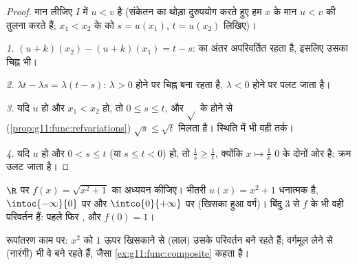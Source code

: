 \begin{proof}
मान लीजिए $I$ में $u < v$ है (संकेतन का थोड़ा दुरुपयोग करते हुए हम $x$
के मान $u < v$ की तुलना करते हैं; $x_1 < x_2$ के  को $s = u(x_1)$, $t = u(x_2)$ लिखिए)।

\emph{1.} $(u+k)(x_2) - (u+k)(x_1) = t - s$:  का अंतर अपरिवर्तित रहता है, इसलिए उसका चिह्न
भी।

\emph{2.} $\lambda t - \lambda s = \lambda(t - s)$: $\lambda > 0$ होने पर चिह्न बना रहता है, $\lambda < 0$ होने पर पलट जाता
है।

\emph{3.} यदि $u$  हो और $x_1 < x_2$ हो, तो $0 \leq s \leq t$, और $\sqrt{}$ के 
होने से (\cref{prop:g11:func:refvariations}) $\sqrt s \leq \sqrt t$ मिलता है।  स्थिति में भी वही तर्क।

\emph{4.} यदि $u$  हो और $0 < s \leq t$ (या $s \leq t < 0$) हो, तो $\frac1s \geq \frac1t$, क्योंकि
$x \mapsto \frac1x$ $0$ के दोनों ओर  है: क्रम उलट जाता है।
\end{proof}

\begin{example}\label{ex:g11:func:composite}
$\R$ पर $f(x) = \sqrt{x^2 + 1}$ का अध्ययन कीजिए। भीतरी  $u(x) = x^2 + 1$ धनात्मक है, $\intoc{-\infty}{0}$ पर
 और $\intco{0}{+\infty}$ पर  (खिसका हुआ वर्ग)। बिंदु 3 से $f$ के भी वही
परिवर्तन हैं: पहले  फिर , और  $f(0) = 1$।
\end{example}

\begin{omfigure}

{\small रूपांतरण काम पर: $x^2$ को $1$ ऊपर खिसकाने से (लाल) उसके परिवर्तन
बने रहते हैं; वर्गमूल लेने से (नारंगी) भी वे बने रहते हैं, जैसा \cref{ex:g11:func:composite} कहता
है।}
\end{omfigure}

